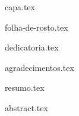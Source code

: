 \documentclass[
	12pt,				%
	openright,			%
	oneside,			%
	a4paper,			%
	brazil,  			%
	french,				%
	spanish,			%
	english				%
	]{abntex2}
\begin{document}

\frenchspacing 



{capa.tex}
\imprimircapa


{folha-de-rosto.tex}
\imprimirfolhaderosto*

%
%
\begin{fichacatalografica}
    
\end{fichacatalografica}

%
%
\begin{folhadeaprovacao}
    
\end{folhadeaprovacao}

%
%
\begin{dedicatoria}
    {dedicatoria.tex}
\end{dedicatoria}

%
%
\begin{agradecimentos}
    {agradecimentos.tex}
\end{agradecimentos}


\setlength{\absparsep}{18pt} %
{resumo.tex}

{abstract.tex}

\listoffigures*
\cleardoublepage

\listoftables*
\cleardoublepage
\end{document}
